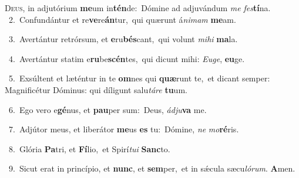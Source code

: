 \lettrine{\initial\textcolor{\initialcolor}{D}}{eus,} in adjutórium \textbf{me}\-um in\-\textbf{tén}\-de:~\star Dómine ad adjuvándum \textit{me} \textit{fes}\-\textbf{tí}na.\\
{\numbfont\textcolor{\numbcolor}{~2.}}~Confundántur et re\-\textbf{ve}\-re\-\textbf{án}\-tur,~\star qui quærunt á\-\textit{ni}\-\textit{mam} \textbf{me}\-am.\par
{\numbfont\textcolor{\numbcolor}{~3.}}~Avertántur retrórsum, et \textbf{e}\-ru\-\textbf{bés}\-cant,~\star qui volunt \textit{mi}\-\textit{hi} \textbf{ma}\-la.\par
{\numbfont\textcolor{\numbcolor}{~4.}}~Avertántur statim e\-\textbf{ru}\-be\-\textbf{scén}\-tes,~\star qui dicunt mihi: \textit{Eu}\-\textit{ge}, \textbf{eu}\-ge.\par
{\numbfont\textcolor{\numbcolor}{~5.}}~Exsúltent et læténtur in te \textbf{om}\-nes qui \textbf{quæ}\-runt te,~\star et dicant semper: Magnificétur Dóminus: qui díligunt salu\-\textit{tá}\-\textit{re} \textbf{tu}\-um.\par
{\numbfont\textcolor{\numbcolor}{~6.}}~Ego vero e\-\textbf{gé}\-nus, et \textbf{pau}\-per sum:~\star Deus, \textit{ád}\-\textit{ju}\textbf{va} me.\par
{\numbfont\textcolor{\numbcolor}{~7.}}~Adjútor meus, et liberátor \textbf{me}\-us \textbf{es} tu:~\star Dómine, \textit{ne} \textit{mo}\-\textbf{ré}ris.\par
{\numbfont\textcolor{\numbcolor}{~8.}}~Glória \textbf{Pa}\-tri, et \textbf{Fí}\-lio,~\star et Spirí\-\textit{tu}\-\textit{i} \textbf{Sanc}\-to.\par
{\numbfont\textcolor{\numbcolor}{~9.}}~Sicut erat in princípio, et \textbf{nunc}\-, et \textbf{sem}\-per,~\star et in sǽcula sæcu\-\textit{ló}\-\textit{rum}. \textbf{A}\-men.\par
